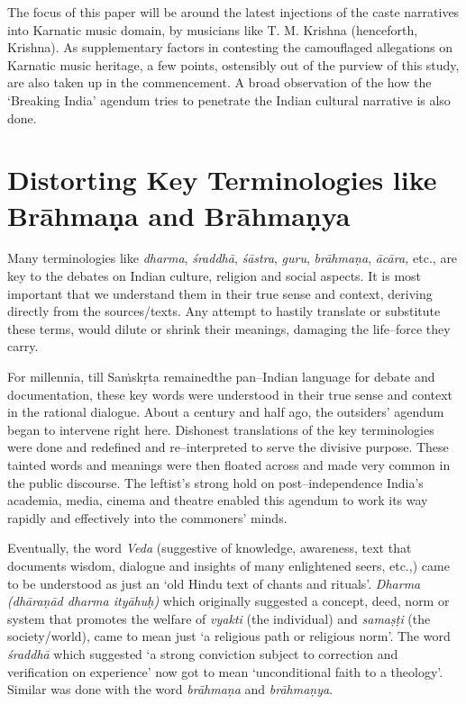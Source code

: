 The focus of this paper will be around the latest injections of the caste narratives into Karnatic music domain, by musicians like T. M. Krishna (henceforth, Krishna). As supplementary factors in contesting the camouflaged allegations on Karnatic music heritage, a few points, ostensibly out of the purview of this study, are also taken up in the commencement. A broad observation of the how the ‘Breaking India’ agendum tries to penetrate the Indian cultural narrative is also done.

\vspace{-.4cm}

\section*{Distorting Key Terminologies like Brāhmaṇa and Brāhmaṇya}

Many terminologies like \textit{dharma}, \textit{śraddhā}, \textit{śāstra}, \textit{guru}, \textit{brāhmaṇa}, \textit{ācāra,} etc., are key to the debates on Indian culture, religion and social aspects. It is most important that we understand them in their true sense and context, deriving directly from the sources/texts. Any attempt to hastily translate or substitute these terms, would dilute or shrink their meanings, damaging the life–force they carry.

For millennia, till Saṁskṛta remainedthe pan–Indian language for debate and documentation, these key words were understood in their true sense and context in the rational dialogue. About a century and half ago, the outsiders’ agendum began to intervene right here. Dishonest translations of the key terminologies were done and redefined and re–interpreted to serve the divisive purpose. These tainted words and meanings were then floated across and made very common in the public discourse. The leftist’s strong hold on post–independence India’s academia, media, cinema and theatre enabled this agendum to work its way rapidly and effectively into the commoners’ minds.

Eventually, the word \textit{Veda} (suggestive of knowledge, awareness, text that documents wisdom, dialogue and insights of many enlightened seers, etc.,) came to be understood as just an ‘old Hindu text of chants and rituals’. \textit{Dharma (dhāraṇād dharma ityāhuḥ)} which originally suggested a concept, deed, norm or system that promotes the welfare of \textit{vyakti} (the individual) and \textit{samaṣṭi} (the society/world), came to mean just ‘a religious path or religious norm’. The word \textit{śraddhā} which suggested ‘a strong conviction subject to correction and verification on experience’ now got to mean ‘unconditional faith to a theology’. Similar was done with the word \textit{brāhmaṇa} and \textit{brāhmaṇya}.


